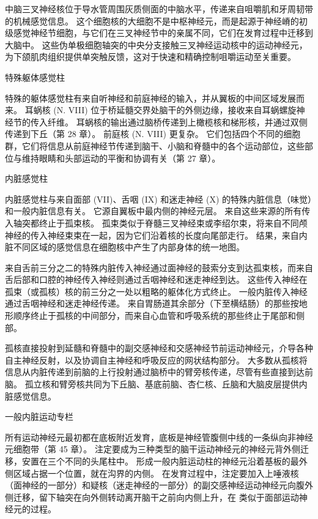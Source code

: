 中脑三叉神经核位于导水管周围灰质侧面的中脑水平，传递来自咀嚼肌和牙周韧带的机械感觉信息。 这个细胞核的大细胞不是中枢神经元，而是起源于神经嵴的初级感觉神经节细胞，与它们在三叉神经节中的亲属不同，它们在发育过程中迁移到大脑中。 这些伪单极细胞轴突的中央分支接触三叉神经运动核中的运动神经元，为下颌肌肉组织提供单突触反馈，这对于快速和精确控制咀嚼运动至关重要。

特殊躯体感觉柱

特殊的躯体感觉柱有来自听神经和前庭神经的输入，并从翼板的中间区域发展而来。 耳蜗核 (N. VIII) 位于桥延髓交界处脑干的外侧边缘，接收来自耳蜗螺旋神经节的传入纤维。 耳蜗核的输出通过脑桥传递到上橄榄核和梯形核，并通过双侧传递到下丘（第 28 章）。 前庭核 (N. VIII) 更复杂。 它们包括四个不同的细胞群，它们将信息从前庭神经节传递到脑干、小脑和脊髓中的各个运动部位，这些部位与维持眼睛和头部运动的平衡和协调有关（第 27 章）。

内脏感觉柱

内脏感觉柱与来自面部 (VII)、舌咽 (IX) 和迷走神经 (X) 的特殊内脏信息（味觉）和一般内脏信息有关。 它源自翼板中最内侧的神经元层。 来自这些来源的所有传入轴突都终止于孤束核。 孤束类似于脊髓三叉神经束或李绍尔束，将来自不同颅神经的传入神经束束在一起，因为它们沿着核的长度向尾部走行。 结果，来自内脏不同区域的感觉信息在细胞核中产生了内部身体的统一地图。

来自舌前三分之二的特殊内脏传入神经通过面神经的鼓索分支到达孤束核，而来自舌后部和口腔的神经传入神经则通过舌咽神经和迷走神经到达。 这些传入神经在孤束（或孤核）核的前三分之一处以粗略的躯体化方式终止。 一般内脏传入神经通过舌咽神经和迷走神经传递。 来自胃肠道其余部分（下至横结肠）的那些按地形顺序终止于孤核的中间部分，而来自心血管和呼吸系统的那些终止于尾部和侧部。

孤核直接投射到延髓和脊髓中的副交感神经和交感神经节前运动神经元，介导各种自主神经反射，以及协调自主神经和呼吸反应的网状结构部分。 大多数从孤核将信息从内脏传递到前脑的上行投射通过脑桥中的臂旁核传递，尽管有些直接到达前脑。 孤立核和臂旁核共同为下丘脑、基底前脑、杏仁核、丘脑和大脑皮层提供内脏感觉信息。

一般内脏运动专栏

所有运动神经元最初都在底板附近发育，底板是神经管腹侧中线的一条纵向非神经元细胞带（第 45 章）。 注定要成为三种类型的脑干运动神经元的神经元背外侧迁移，安置在三个不同的头尾柱中。 形成一般内脏运动柱的神经元沿着基板的最外侧区域占据一个位置，就在沟界的内侧。 在发育过程中，注定要加入上唾液核（面神经的一部分）和疑核（迷走神经的一部分）的副交感神经运动神经元向腹外侧迁移，留下轴突在向外侧转动离开脑干之前向内侧上升，在 类似于面部运动神经元的过程。

